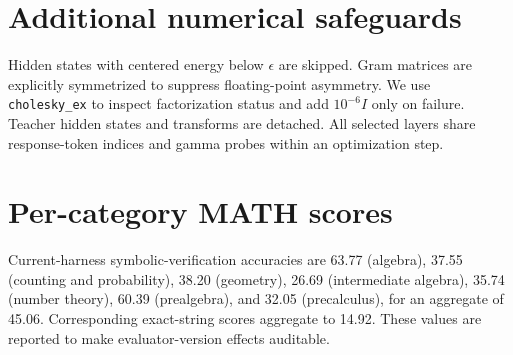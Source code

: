 \documentclass{article}
\begin{document}
\section{Additional numerical safeguards}
Hidden states with centered energy below $\epsilon$ are skipped.  Gram
matrices are explicitly symmetrized to suppress floating-point asymmetry.  We
use \texttt{cholesky\_ex} to inspect factorization status and add
$10^{-6}I$ only on failure.  Teacher hidden states and transforms are detached.
All selected layers share response-token indices and gamma probes within an
optimization step.

\section{Per-category MATH scores}
Current-harness symbolic-verification accuracies are 63.77 (algebra), 37.55
(counting and probability), 38.20 (geometry), 26.69 (intermediate algebra),
35.74 (number theory), 60.39 (prealgebra), and 32.05 (precalculus), for an
aggregate of 45.06.  Corresponding exact-string scores aggregate to 14.92.
These values are reported to make evaluator-version effects auditable.
\end{document}
